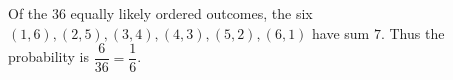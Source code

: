 Of the $36$ equally likely ordered outcomes, the six $(1,6),(2,5),(3,4),(4,3),(5,2),(6,1)$ have sum $7$. Thus the probability is $\dfrac{6}{36}=\boxed{\dfrac{1}{6}}$.
